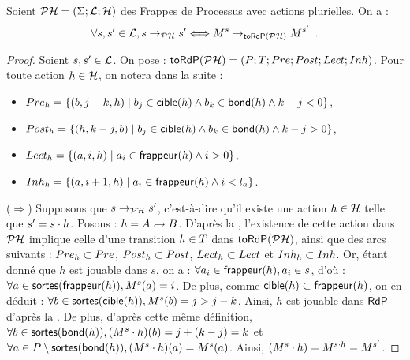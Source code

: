 \begin{theorem}[$\PH \approx \phmtopt$]
  Soient $\mathcal{PH} = (\Sigma; \mathcal{L}; \mathcal{H})$ des Frappes de Processus avec actions plurielles.
  On a :
  \[\forall s, s' \in \mathcal{L}, s \rightarrow_{\mathcal{PH}} s' \Longleftrightarrow
    M^s \rightarrow_{\mathsf{toRdP}(\mathcal{PH})} M^{s'} \enspace.\]
\end{theorem}

\begin{proof}
  Soient $s, s' \in \mathcal{L}$.
  On pose : $\mathsf{toRdP}(\mathcal{PH}) = (P; T; Pre; Post; Lect; Inh)$.
  Pour toute action $h \in \mathcal{H}$, on notera dans la suite :
  \begin{itemize}
    \item $Pre_h = \{ (b, j-k, h) \mid b_j \in \mathsf{cible}(h) \wedge
      b_k \in \mathsf{bond}(h) \wedge k-j < 0 \}$,
    \item $Post_h = \{ (h, k-j, b) \mid b_j \in \mathsf{cible}(h) \wedge
      b_k \in \mathsf{bond}(h) \wedge k-j > 0 \}$,
    \item $Lect_h = \{ (a, i, h) \mid a_i \in \mathsf{frappeur}(h) \wedge i > 0 \}$,
    \item $Inh_h = \{ (a, i+1, h) \mid a_i \in \mathsf{frappeur}(h) \wedge i < l_a \}$.
  \end{itemize}
  
  ($\Rightarrow$) Supposons que $s \rightarrow_{\mathcal{PH}} s'$, c'est-à-dire qu'il existe une action $h \in \mathcal{H}$
    telle que $s' = s \cdot h$.
    Posons : $h = \mbox{$A \rightarrowtail B$}$.
    D'après la ,
    l'existence de cette action dans $\mathcal{PH}$ implique celle d'une transition $h \in T$
    dans $\mathsf{toRdP}(\mathcal{PH})$, ainsi que des arcs suivants :
    $Pre_h \subset Pre$, $Post_h \subset Post$,
    $Lect_h \subset Lect$ et $Inh_h \subset Inh$.
    Or, étant donné que $h$ est jouable dans $s$, on a :
    $\forall a_i \in \mathsf{frappeur}(h), a_i \in s$, d'où :
    $\forall a \in \mathsf{sortes}(\mathsf{frappeur}(h)), M^s(a) = i$.
    De plus, comme $\mathsf{cible}(h) \subset \mathsf{frappeur}(h)$, on en déduit :
    $\forall b \in \mathsf{sortes}(\mathsf{cible}(h)), M^s(b) = j > j-k$.
    Ainsi, $h$ est jouable dans $\mathsf{RdP}$ d'après la .
    De plus, d'après cette même définition,
    $\forall b \in \mathsf{sortes}(\mathsf{bond}(h)), (M^s \cdot h)(b) = j + (k - j) = k$
    et $\forall a \in P \setminus \mathsf{sortes}(\mathsf{bond}(h)), (M^s \cdot h)(a) = M^s(a)$.
    Ainsi, $(M^s \cdot h) = M^{s \cdot h} = M^{s'}$.
  

\end{proof}
